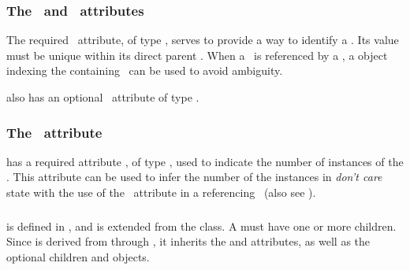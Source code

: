 \subsubsection{The \idAtt\ and \nameAtt\ attributes}
\label{def:SpeciesFeatureType:idAndName}

The required \idAtt\ attribute, of type \SIdPT, serves to provide a way to identify a \speciesFeatureType. Its value must be unique within its direct parent \speciesType. When a \speciesFeatureType\ is referenced by a \speciesFeature, a \SpeciesTypeComponentIndex object indexing the containing \component\ can be used to avoid ambiguity. 

 also has an optional \nameAtt\ attribute of type \stringPT. 

\subsubsection{The \occurAtt\ attribute}
\label{def:SpeciesFeatureType:occur}

 has a required attribute \occurAtt, of type \positiveIntegerPT, used to indicate the number of instances of the \speciesFeatureType. This attribute can be used to infer the number of the instances in \emph{don't care} state with the use of the \occurAtt\ attribute in a referencing \speciesFeature\ (also see ). 


\subsubsection{}
\label{def:ListOfPossibleSpeciesFeatureValues}

 is defined in , and is extended from the  class. A 
 must have one or more \PossibleSpeciesFeatureValue children. Since  is derived from  through , it inherits the  and  attributes, as well as the optional children  and  objects. 


\clearpage

